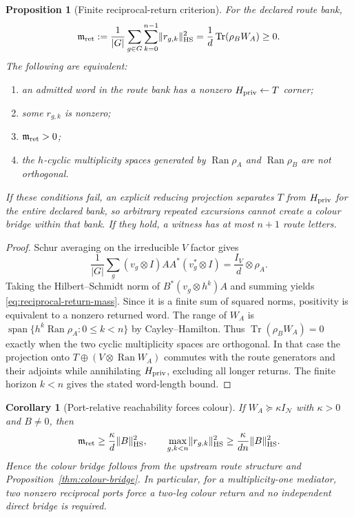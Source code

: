 \documentclass[11pt]{article}
\numberwithin{equation}{section}
\newtheorem{proposition}[theorem]{Proposition}
\newtheorem{corollary}[theorem]{Corollary}
\theoremstyle{definition}
\theoremstyle{remark}
\newcommand{\Tr}{\operatorname{Tr}}
\newcommand{\Ran}{\operatorname{Ran}}
\newcommand{\Span}{\operatorname{span}}
\newcommand{\HS}{\mathrm{HS}}
\newcommand{\norm}[1]{\lVert#1\rVert}
\begin{document}
\begin{proposition}[Finite reciprocal-return criterion]
\label{thm:reciprocal-return}
For the declared route bank,
\begin{equation}
 \mathfrak m_{\rm ret}
 :=\frac1{|G|}\sum_{g\in G}\sum_{k=0}^{n-1}
       \norm{r_{g,k}}_{\HS}^2
 =\frac1d\Tr(\rho_BW_A)\ge0.
 \label{eq:reciprocal-return-mass}
\end{equation}
The following are equivalent:
\begin{enumerate}[label=\textup{(\roman*)},leftmargin=2.8em]
\item an admitted word in the route bank has a nonzero
      $H_{\rm priv}\leftarrow T$ corner;
\item some $r_{g,k}$ is nonzero;
\item $\mathfrak m_{\rm ret}>0$;
\item the $h$-cyclic multiplicity spaces generated by $\Ran\rho_A$ and
      $\Ran\rho_B$ are not orthogonal.
\end{enumerate}
If these conditions fail, an explicit reducing projection separates $T$ from
$H_{\rm priv}$ for the entire declared bank, so arbitrary repeated excursions
cannot create a colour bridge within that bank.  If they hold, a witness has
at most $n+1$ route letters.
\end{proposition}

\begin{proof}
Schur averaging on the irreducible $V$ factor gives
\[
 \frac1{|G|}\sum_g
 (v_g\otimes I)AA^*(v_g^*\otimes I)
 =\frac{I_V}{d}\otimes\rho_A.
\]
Taking the Hilbert--Schmidt norm of $B^*(v_g\otimes h^k)A$ and summing yields
\eqref{eq:reciprocal-return-mass}.  Since it is a finite sum of squared norms,
positivity is equivalent to a nonzero returned word.  The range of $W_A$ is
$\Span\{h^k\Ran\rho_A:0\le k<n\}$ by Cayley--Hamilton.  Thus
$\Tr(\rho_BW_A)=0$ exactly when the two cyclic multiplicity spaces are
orthogonal.  In that case the projection onto
$T\oplus(V\otimes\Ran W_A)$ commutes with the route generators and their
adjoints while annihilating $H_{\rm priv}$, excluding all longer returns.  The
finite horizon $k<n$ gives the stated word-length bound.
\end{proof}

\begin{corollary}[Port-relative reachability forces colour]
\label{cor:reciprocal-return-force}
If $W_A\succeq\kappa I_{\mathcal N}$ with $\kappa>0$ and $B\ne0$, then
\begin{equation}
 \mathfrak m_{\rm ret}\ge\frac{\kappa}{d}\norm B_{\HS}^2,
 \qquad
 \max_{g,k<n}\norm{r_{g,k}}_{\HS}^2
 \ge\frac{\kappa}{dn}\norm B_{\HS}^2.
 \label{eq:reciprocal-return-margin}
\end{equation}
Hence the colour bridge follows from the upstream route structure and
Proposition~\ref{thm:colour-bridge}.  In particular, for a multiplicity-one
mediator, two nonzero reciprocal ports force a two-leg colour return and no
independent direct bridge is required.
\end{corollary}
\end{document}
